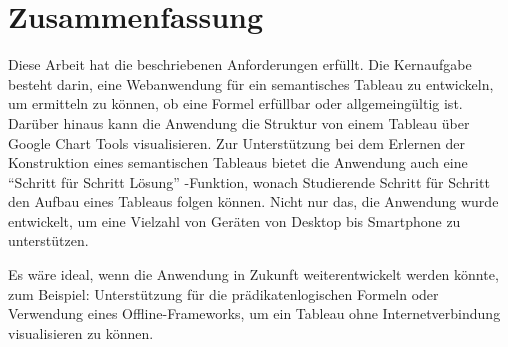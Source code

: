 \chapter{Zusammenfassung}
Diese Arbeit hat die beschriebenen Anforderungen erfüllt. Die Kernaufgabe besteht darin, eine Webanwendung für ein semantisches Tableau zu entwickeln, um ermitteln zu können, ob eine Formel erfüllbar oder allgemeingültig ist. Darüber hinaus kann die Anwendung die Struktur von einem Tableau über Google Chart Tools visualisieren. Zur Unterstützung bei dem Erlernen der Konstruktion eines semantischen Tableaus bietet die Anwendung auch eine ``Schritt für Schritt Lösung'' -Funktion, wonach Studierende Schritt für Schritt den Aufbau eines Tableaus folgen können. Nicht nur das, die Anwendung wurde entwickelt, um eine Vielzahl von Geräten von Desktop bis Smartphone zu unterstützen.

Es wäre ideal, wenn die Anwendung in Zukunft weiterentwickelt  werden könnte, zum Beispiel: Unterstützung für die prädikatenlogischen Formeln oder Verwendung eines Offline-Frameworks, um ein Tableau ohne Internetverbindung visualisieren zu können.

